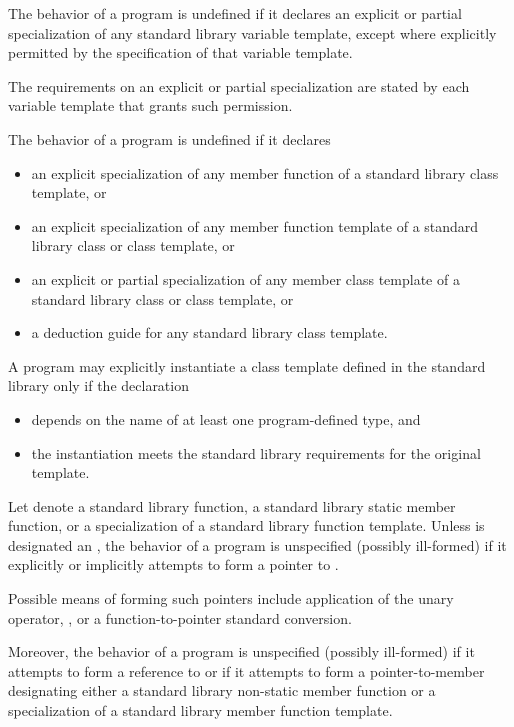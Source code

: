 \pnum
The behavior of a \Cpp{} program is undefined
if it declares an explicit or partial specialization
of any standard library variable template,
except where explicitly permitted by the specification of that variable template.
\begin{note}
The requirements on an explicit or partial specialization
are stated by each variable template that grants such permission.
\end{note}

\pnum
The behavior of a \Cpp{} program is undefined if it declares
\begin{itemize}
\item an explicit specialization of any member function of a standard
library class template, or

\item an explicit specialization of any member function template of a
standard library class or class template, or

\item an explicit or partial specialization of any member class template
of a standard library class or class template, or

\item a deduction guide for any standard library class template.
\end{itemize}

\pnum
A program may explicitly instantiate
a class template defined in the standard library
only if the declaration
\begin{itemize}
\item depends on the name of at least one program-defined type, and

\item the instantiation meets the standard library requirements for the
original template.
\end{itemize}

\pnum
Let  denote
a standard library function,
a standard library static member function,
or a specialization
of a standard library function template.
Unless  is designated
an ,
the behavior of a \Cpp{} program is unspecified (possibly ill-formed)
if it explicitly or implicitly attempts
to form a pointer
to .
\begin{note}
Possible means of forming such pointers include
application of the unary \tcode{\&} operator,
,
or
a function-to-pointer standard conversion.
\end{note}
Moreover,
the behavior of a \Cpp{} program is unspecified (possibly ill-formed)
if it attempts to form a reference
to 
or
if it attempts to form a pointer-to-member designating
either a standard library non-static member function
or a specialization of a standard library member function template.

